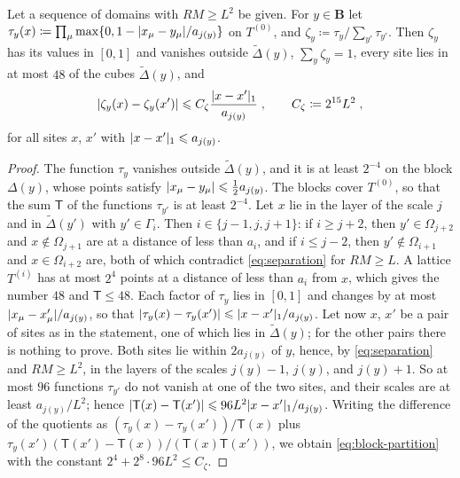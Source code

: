 \documentclass[11pt]{preprint}
\DeclarePairedDelimiter{\abs}{\lvert}{\rvert}
\numberwithin{equation}{section}
\begin{document}
\begin{lemma}\label{lem:block-partition}
Let a sequence of domains with $RM \geqslant L^2$ be given. For $y \in \mathbf B$ let $\tau_y(x) \coloneqq \prod_\mu\max\{ 0, 1 - \abs{x_\mu - y_\mu}/a_{j(y)} \}$ on $T^{(0)}$, and $\zeta_y \coloneqq \tau_y/\sum_{y'}\tau_{y'}$. Then $\zeta_y$ has its values in $[0, 1]$ and vanishes outside $\tilde\Delta(y)$, $\sum_y\zeta_y = 1$, every site lies in at most $48$ of the cubes $\tilde\Delta(y)$, and
\begin{equation}\label{eq:block-partition}
    \abs{\zeta_y(x) - \zeta_y(x')} \leqslant C_\zeta\frac{\abs{x - x'}_1}{a_{j(y)}}\;,
    \qquad
    C_\zeta \coloneqq 2^{15}L^2\;,
\end{equation}
for all sites $x$, $x'$ with $\abs{x - x'}_1 \leqslant a_{j(y)}$.
\end{lemma}

\begin{proof}
The function $\tau_y$ vanishes outside $\tilde\Delta(y)$, and it is at least $2^{-4}$ on the block $\Delta(y)$, whose points satisfy $\abs{x_\mu - y_\mu} \leqslant \frac{1}{2}a_{j(y)}$. The blocks cover $T^{(0)}$, so that the sum $\mathsf T$ of the functions $\tau_{y'}$ is at least $2^{-4}$. Let $x$ lie in the layer of the scale $j$ and in $\tilde\Delta(y')$ with $y' \in \Gamma_i$. Then $i \in \{ j - 1, j, j + 1 \}$: if $i \geqslant j + 2$, then $y' \in \Omega_{j+2}$ and $x \notin \Omega_{j+1}$ are at a distance of less than $a_i$, and if $i \leqslant j - 2$, then $y' \notin \Omega_{i+1}$ and $x \in \Omega_{i+2}$ are, both of which contradict \eqref{eq:separation} for $RM \geqslant L$. A lattice $T^{(i)}$ has at most $2^4$ points at a distance of less than $a_i$ from $x$, which gives the number $48$ and $\mathsf T \leqslant 48$. Each factor of $\tau_y$ lies in $[0, 1]$ and changes by at most $\abs{x_\mu - x'_\mu}/a_{j(y)}$, so that $\abs{\tau_y(x) - \tau_y(x')} \leqslant \abs{x - x'}_1/a_{j(y)}$. Let now $x$, $x'$ be a pair of sites as in the statement, one of which lies in $\tilde\Delta(y)$; for the other pairs there is nothing to prove. Both sites lie within $2a_{j(y)}$ of $y$, hence, by \eqref{eq:separation} and $RM \geqslant L^2$, in the layers of the scales $j(y) - 1$, $j(y)$, and $j(y) + 1$. So at most $96$ functions $\tau_{y'}$ do not vanish at one of the two sites, and their scales are at least $a_{j(y)}/L^2$; hence $\abs{\mathsf T(x) - \mathsf T(x')} \leqslant 96L^2\abs{x - x'}_1/a_{j(y)}$. Writing the difference of the quotients as $(\tau_y(x) - \tau_y(x'))/\mathsf T(x)$ plus $\tau_y(x')(\mathsf T(x') - \mathsf T(x))/(\mathsf T(x)\mathsf T(x'))$, we obtain \eqref{eq:block-partition} with the constant $2^4 + 2^8 \cdot 96L^2 \leqslant C_\zeta$.
\end{proof}
\end{document}
